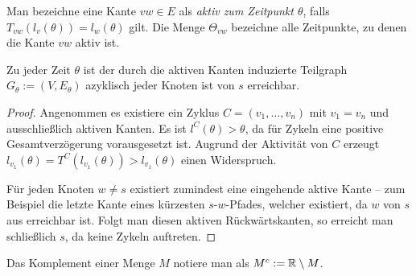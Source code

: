 \begin{definition}
	Man bezeichne eine Kante $vw\in E$ als \emph{aktiv zum Zeitpunkt $\theta$}, falls $T_{vw}(l_v(\theta)) = l_w(\theta)$ gilt.
	Die Menge $\Theta_{vw}$ bezeichne alle Zeitpunkte, zu denen die Kante $vw$ aktiv ist.
\end{definition}

\begin{lemma}\label{lemma-shortest-path-using-active-edges}
	Zu jeder Zeit $\theta$ ist der durch die aktiven Kanten induzierte Teilgraph $G_\theta:=(V, E_\theta)$ azyklisch jeder Knoten ist von $s$ erreichbar.
\end{lemma}
\begin{proof}
	Angenommen es existiere ein Zyklus $C=(v_1, \dots, v_n)$ mit $v_1=v_n$ und ausschließlich aktiven Kanten.
	Es ist $l^C(\theta) > \theta$, da für Zykeln eine positive Gesamtverzögerung vorausgesetzt ist.
	Augrund der Aktivität von $C$ erzeugt $l_{v_1}(\theta) = T^C(l_{v_1}(\theta)) > l_{v_1}(\theta)$ einen Widerspruch.
	
	Für jeden Knoten $w\neq s$ existiert zumindest eine eingehende aktive Kante -- zum Beispiel die letzte Kante eines kürzesten $s$-$w$-Pfades, welcher existiert, da $w$ von $s$ aus erreichbar ist.
	Folgt man diesen aktiven Rückwärtskanten, so erreicht man schließlich $s$, da keine Zykeln auftreten.
\end{proof}

\begin{notation}
	Das Komplement einer Menge $M$ notiere man als $M^c:= \mathbb{R}\setminus M$.
\end{notation}

